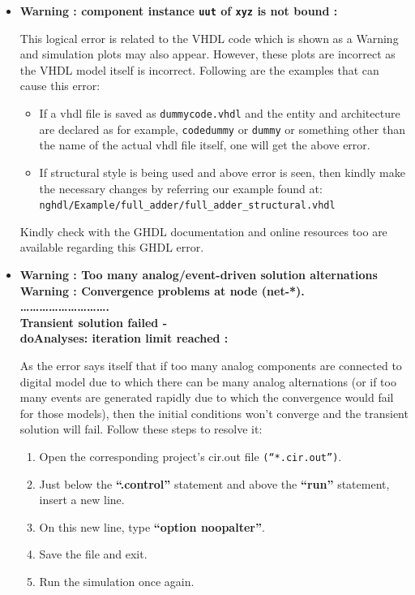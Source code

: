 \begin{itemize}
\item \textbf{Warning : component instance \texttt{uut} of \texttt{xyz}  is not bound  : }

This logical error is related to the VHDL code which is shown as a Warning and simulation plots may also appear. However, these plots are incorrect as the VHDL model itself is incorrect. 
Following are the examples that can cause this error:
\begin{itemize}
\item If a vhdl file is saved as \texttt{dummycode.vhdl} and the entity and architecture 
are declared as for example, \texttt{codedummy} or \texttt{dummy} or something other than the name of the actual vhdl file itself, one will get the above error.
\item If structural style is being used and above error is seen, then kindly make the necessary changes by referring our example found at:\\ \texttt{nghdl/Example/full\_adder/full\_adder\_structural.vhdl}
\end{itemize}
Kindly check with the GHDL documentation and online resources too are available regarding this GHDL error.

\item \textbf{Warning : Too many analog/event-driven solution alternations \\
     Warning : Convergence problems at node (net-*). \\         
            ………………………. \\
     Transient solution failed - \\
     doAnalyses: iteration limit reached : } 

As the error says itself that if too many analog components are connected to digital model due to which there can be many analog alternations (or if too many events are generated rapidly due to which the convergence would fail for those models), then the initial conditions won’t converge and the transient solution will fail. Follow these steps to resolve it:
\begin{enumerate}
    \item Open the corresponding project’s cir.out file \texttt{(“*.cir.out”)}.
    \item Just below the \textbf{“.control”} statement and above the \textbf{“run”} statement, insert a new 
     line.
     \item On this new line, type \textbf{“option noopalter”}.
     \item Save the file and exit.
     \item Run the simulation once again.
\end{enumerate}



\end{itemize}
